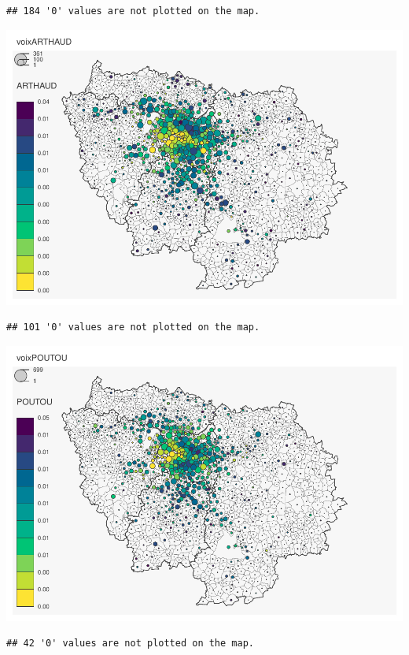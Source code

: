 \documentclass[
]{book}
\begin{document}
\begin{verbatim}
## 184 '0' values are not plotted on the map.
\end{verbatim}

\includegraphics{manuel_geo_quanti_files/figure-latex/unnamed-chunk-52-1.pdf}

\begin{verbatim}
## 101 '0' values are not plotted on the map.
\end{verbatim}

\includegraphics{manuel_geo_quanti_files/figure-latex/unnamed-chunk-52-2.pdf}

\begin{verbatim}
## 42 '0' values are not plotted on the map.
\end{verbatim}
\end{document}
